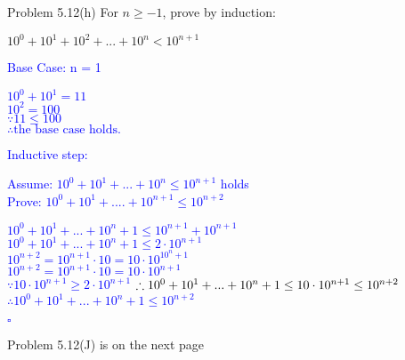 \documentclass{article}
\begin{document}
\begin{addmargin}[2em]{2em}
	Problem 5.12(h) For $n \geq -1$, prove by induction:
	\begin{center}
		$10^0 + 10^1 + 10^2 + ... +10^n < 10^{n+1}$
	\end{center}
	
	\textcolor{blue}{
		Base Case: n = 1
		\begin{addmargin}[2.3cm]{0em}
				$10^0 + 10^1 = 11$\\
			    $10^2 = 100$\\
			    $\because 11 \le 100$\\
			    $\therefore \text{the base case holds.}$	
		\end{addmargin}}
	
	\textcolor{blue}{
		Inductive step:
		\begin{addmargin}[3cm]{0em}
			Assume: $10^0+10^1+...+10^n \le 10^{n+1}$ holds\\
			Prove: $10^0 + 10^1 +....+ 10^{n+1} \le 10^{n+2}$
		\end{addmargin}}
	
	\textcolor{blue}{
		\begin{addmargin}[3.5cm]{0em}
			$10^0 + 10^1 +... +10^n+1 \le 10^{n+1} + 10^{n+1}$\\
			$10^0 + 10^1 +... +10^n+1 \le 2 \cdot 10^{n+1}$\\
			$10^{n+2} = 10^{n+1} \cdot 10 = 10 \cdot 10^{10^n+1}$\\
			$10^{n+2} = 10 ^{n+1} \cdot 10 = 10 \cdot 10^{n+1}$\\
			$\because 10 \cdot 10^{n+1} \ge 2 \cdot 10^{n+1}$
			$\therefore 10^0 + 10^1 +... +10^n+1 \le 10 \cdot 10^{n+1}\\ \le 10^{n+2}$\\
			$\therefore 10^0 + 10^1 +... +10^n+1 \le 10^{n+2}$\\
		\end{addmargin}
		\begin{flushright}
			$\square$
		\end{flushright}
	}
Problem 5.12(J) is on the next page
\end{addmargin}


\clearpage
\end{document}
